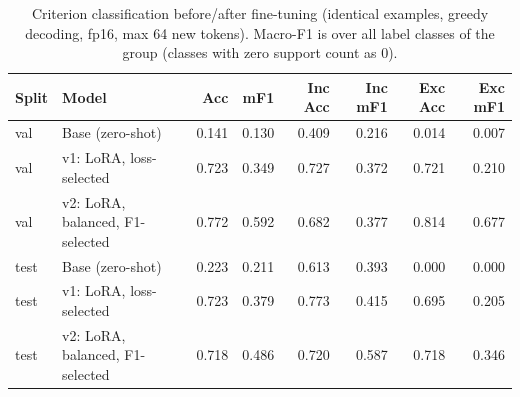 \begin{table}[t]
\centering
\caption{Criterion classification before/after fine-tuning (identical examples, greedy decoding, fp16, max 64 new tokens). Macro-F1 is over all label classes of the group (classes with zero support count as 0).}
\label{tab:cls}
\footnotesize
\begin{tabular}{llrrrrrr}
\toprule
Split & Model & Acc & mF1 & Inc Acc & Inc mF1 & Exc Acc & Exc mF1 \\
\midrule
val & Base (zero-shot) & 0.141 & 0.130 & 0.409 & 0.216 & 0.014 & 0.007 \\
val & v1: LoRA, loss-selected & 0.723 & 0.349 & 0.727 & 0.372 & 0.721 & 0.210 \\
val & v2: LoRA, balanced, F1-selected & 0.772 & 0.592 & 0.682 & 0.377 & 0.814 & 0.677 \\
test & Base (zero-shot) & 0.223 & 0.211 & 0.613 & 0.393 & 0.000 & 0.000 \\
test & v1: LoRA, loss-selected & 0.723 & 0.379 & 0.773 & 0.415 & 0.695 & 0.205 \\
test & v2: LoRA, balanced, F1-selected & 0.718 & 0.486 & 0.720 & 0.587 & 0.718 & 0.346 \\
\bottomrule
\end{tabular}
\end{table}
